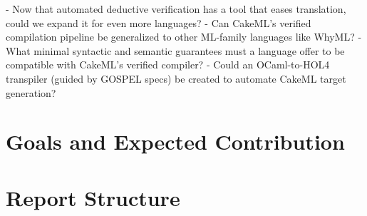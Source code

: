 - Now that automated deductive verification has a tool that eases translation, could we expand it for even more languages?
- Can CakeML's verified compilation pipeline be generalized to other ML-family languages like WhyML?
- What minimal syntactic and semantic guarantees must a language offer to be compatible with CakeML's verified compiler?
- Could an OCaml-to-HOL4 transpiler (guided by GOSPEL specs) be created to automate CakeML target generation?

\section{Goals and Expected Contribution}
\label{sec:Goals_and_Expected_Contribution}

\section{Report Structure}
\label{sec:Report_Structure}